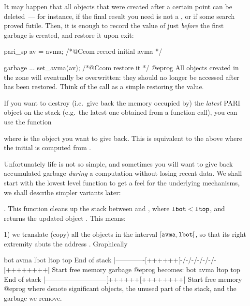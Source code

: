 \noindent\item
It may happen that all objects that were created after a certain point can
be deleted~--- for instance, if the final result you need is not a
, or if some search proved futile. Then, it is enough to record
the value of  just \emph{before} the first garbage is created,
and restore it upon exit:

\bprog
pari_sp av = avma; /*@Ccom record initial avma */

garbage ...
set_avma(av); /*@Ccom restore it */
@eprog
\noindent All objects created in the  zone will eventually
be overwritten: they should no longer be accessed after  has been
restored. Think of the  call as a simple 
restoring the  value.

\noindent\item
If you want to destroy (i.e.~give back the memory occupied by) the
\emph{latest} PARI object on the stack (e.g.~the latest one obtained from a
function call), you can use the function%


\noindent where  is the object you want to give back. This is
equivalent to the above where the initial  is computed from .

\noindent\item
Unfortunately life is not so simple, and sometimes you will want
to give back accumulated garbage \emph{during} a computation without losing
recent data. We shall start with the lowest level function to get a feel for
the underlying mechanisms, we shall describe simpler variants later:

. This function cleans
up the stack between  and , where ${\tt lbot} <
{\tt ltop}$, and returns the updated object . This means:

1) we translate (copy) all the objects in the interval
$[{\tt avma}, {\tt lbot}[$, so that its right extremity abuts the address
. Graphically

\vbox{\bprog
             bot           avma   lbot          ltop     top
End of stack  |-------------[++++++[-/-/-/-/-/-/-|++++++++|  Start
                free memory            garbage
@eprog
\noindent becomes:
\bprog
             bot                         avma   ltop     top
End of stack  |---------------------------[++++++[++++++++|  Start
                       free memory
@eprog
}
\noindent where \kbd{++} denote significant objects, \kbd{--} the unused part
of the stack, and \kbd{-/-} the garbage we remove.

